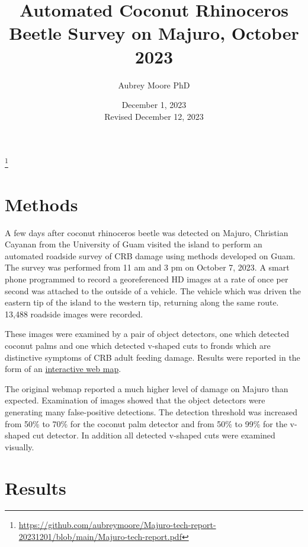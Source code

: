 \documentclass[12pt,letterpaper,english,bibliography=totocnumbered, abstract=on]{scrartcl}
\begin{document}
\titlehead{DRAFT TECHNICAL REPORT}

\title{Automated Coconut Rhinoceros Beetle Survey on Majuro, October 2023}

\author{Aubrey Moore PhD}

\date{December 1, 2023\\Revised December 12, 2023}

\maketitle

\footnote{\url{https://github.com/aubreymoore/Majuro-tech-report-20231201/blob/main/Majuro-tech-report.pdf}}


\pagebreak

\section{Methods}

A few days after coconut rhinoceros beetle was detected on Majuro, Christian Cayanan from the University of Guam visited the island to perform an automated roadside survey of CRB damage using methods developed on Guam. The survey was performed from 11 am and 3 pm on October 7, 2023. A smart phone programmed to record a georeferenced HD images at a rate of once per second was attached to the outside of a vehicle. The vehicle which was driven the eastern tip of the island to the western tip, returning along the same route. 13,488 roadside images were recorded.

These images were examined by a pair of object detectors, one which detected coconut palms and one which detected v-shaped cuts to fronds which are distinctive symptoms of CRB adult feeding damage. Results were reported in the form of an \href{https://aubreymoore.github.io/Majuro-CRB-Damage-Map-2023-10/webmap/#12/7.1098/171.2099}{interactive web map}. 

The original webmap reported a much higher level of damage on Majuro than expected. Examination of images showed that the object detectors were generating many false-positive detections. The detection threshold was increased from 50\% to 70\% for the coconut palm detector and from 50\% to 99\% for the v-shaped cut detector. In addition all detected v-shaped cuts were examined visually.

\section{Results}
\end{document}
